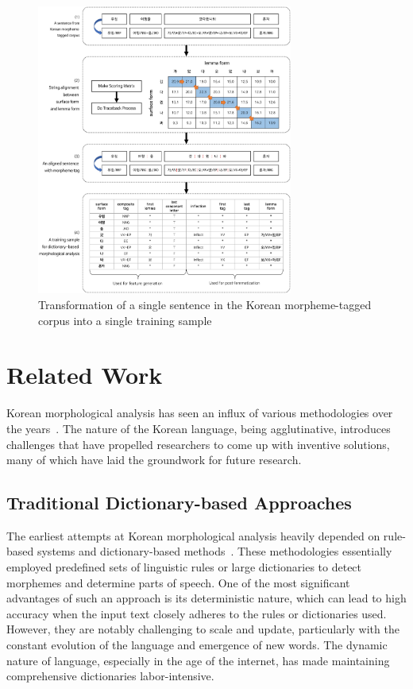 \documentclass[AMS,STIX2COL]{WileyNJD-v2}
\begin{document}
    \begin{figure}[t]
        \centerline{\includegraphics[width=0.75\textwidth]{fig1.1}}
        \caption{Transformation of a single sentence in the Korean morpheme-tagged corpus into a single training sample}\label{fig:sample}
    \end{figure}


    \section{Related Work}\label{sec:related-work}

    Korean morphological analysis has seen an influx of various methodologies over the years~\cite{KwonHC1991, LeeDG2009, ShimKS2011, LeeJS2011, ShinJC2012, LeeCK2013, NaSH2014, NaSH2015, HwangHS2016, KimHM2016, ChungES2016, LeeCH2016, Li2017, NaSH2018, KimSW2018, ChoiYS2018, MinJW2018, MinJW2019, KimHM2019, SongHJ2019, MinJW2020, SongHJ2020, ChoiYS2020, HwangHS2020, KimHJ2021, YounJY2021, MinJW2022, KimJM2022, ShinHJ2023}. The nature of the Korean language, being agglutinative, introduces challenges that have propelled researchers to come up with inventive solutions, many of which have laid the groundwork for future research.

    \subsection{Traditional Dictionary-based Approaches}\label{subsec2.1}
    The earliest attempts at Korean morphological analysis heavily depended on rule-based systems and dictionary-based methods~\cite{KwonHC1991}. These methodologies essentially employed predefined sets of linguistic rules or large dictionaries to detect morphemes and determine parts of speech. One of the most significant advantages of such an approach is its deterministic nature, which can lead to high accuracy when the input text closely adheres to the rules or dictionaries used. However, they are notably challenging to scale and update, particularly with the constant evolution of the language and emergence of new words. The dynamic nature of language, especially in the age of the internet, has made maintaining comprehensive dictionaries labor-intensive.
\end{document}
